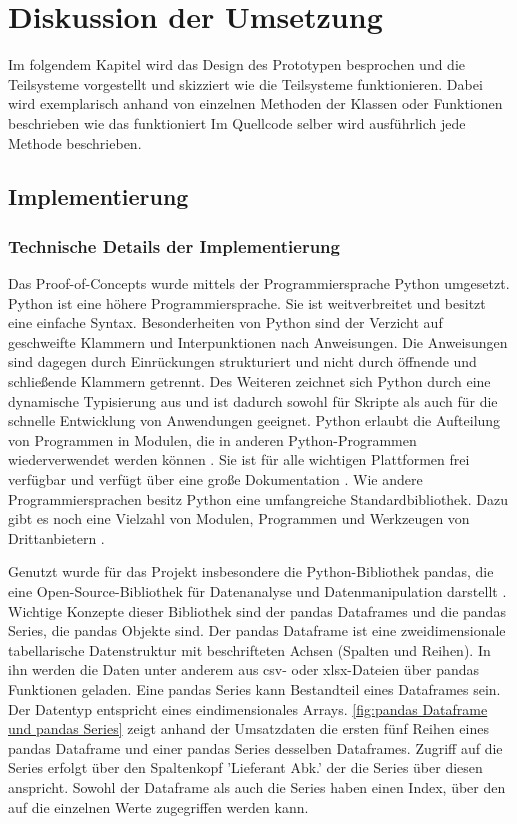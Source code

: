 \chapter{Diskussion der Umsetzung}
\label{chap:five}
Im folgendem Kapitel wird das Design des Prototypen besprochen und die Teilsysteme vorgestellt und skizziert wie die Teilsysteme
funktionieren. Dabei wird exemplarisch anhand von einzelnen Methoden der Klassen oder Funktionen beschrieben wie das funktioniert
Im Quellcode selber wird ausführlich jede Methode beschrieben.
\section{Implementierung}
    \subsection{Technische Details der Implementierung}
    Das Proof-of-Concepts wurde mittels der Programmiersprache Python umgesetzt.
    Python ist eine höhere Programmiersprache. Sie ist weitverbreitet \cite[vgl.][]{loukides_where_2021} und besitzt
    eine einfache Syntax. Besonderheiten von Python sind der Verzicht auf geschweifte Klammern und Interpunktionen nach Anweisungen.
    Die Anweisungen sind dagegen durch Einrückungen strukturiert und nicht durch öffnende und schließende Klammern
    getrennt. Des Weiteren zeichnet sich Python durch eine dynamische Typisierung aus und ist dadurch sowohl für Skripte als auch 
    für die schnelle Entwicklung von Anwendungen geeignet. Python erlaubt die Aufteilung von Programmen in Modulen, die in anderen Python-Programmen wiederverwendet werden können
    \cite[vgl.][]{python_6_2021}.
    Sie ist für alle wichtigen Plattformen frei verfügbar und verfügt über eine große Dokumentation \cite[vgl.][]{python_welcome_2021}.
    Wie andere Programmiersprachen besitz Python eine umfangreiche Standardbibliothek. 
    Dazu gibt es noch eine Vielzahl von Modulen, Programmen und Werkzeugen von Drittanbietern \cite[vgl.][]{python_pypi_2021}.
    
    
    Genutzt wurde für das Projekt insbesondere die Python-Bibliothek pandas, die eine Open-Source-Bibliothek für Datenanalyse und 
    Datenmanipulation darstellt \cite[vgl.][]{pandas_pandas_2021}. 
    Wichtige Konzepte dieser Bibliothek sind der pandas Dataframes und die pandas Series, die pandas Objekte sind. Der pandas Dataframe ist eine zweidimensionale 
    tabellarische Datenstruktur mit beschrifteten Achsen (Spalten und Reihen). In ihn
    werden die Daten unter anderem aus csv- oder xlsx-Dateien über pandas Funktionen geladen.
    Eine pandas Series kann Bestandteil eines Dataframes sein. Der Datentyp entspricht eines eindimensionales Arrays. \autoref{fig:pandas Dataframe und pandas Series} zeigt anhand der Umsatzdaten die ersten fünf Reihen
    eines pandas Dataframe und einer pandas Series desselben Dataframes. Zugriff auf die Series erfolgt über
    den Spaltenkopf 'Lieferant Abk.' der die Series über diesen anspricht. Sowohl der Dataframe als auch die Series haben einen Index, 
    über den auf die einzelnen Werte zugegriffen werden kann. 
    
